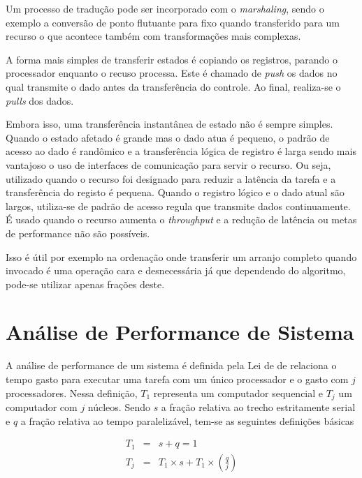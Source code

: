    Um processo de tradução pode ser incorporado com o \textit{marshaling}, sendo o exemplo a conversão de ponto flutuante para fixo quando transferido para um recurso o que acontece também com transformações mais complexas.
   
   A forma mais simples de transferir estados é copiando os registros, parando o processador enquanto o recuso processa.
   Este é chamado de \textit{push} os dados no qual transmite o dado antes da transferência do controle. Ao final, realiza-se o \textit{pulls} dos dados.
   
   
   Embora isso, uma transferência instantânea de estado não é sempre simples. Quando o estado afetado é grande mas o dado atua é pequeno, o padrão de acesso ao dado é randômico e a transferência lógica de registro é larga sendo mais vantajoso o uso de interfaces de comunicação para servir o recurso. Ou seja, utilizado quando o recurso foi designado para reduzir a latência da tarefa e a transferência do registo é pequena.
   Quando o registro lógico e o dado atual são largos, utiliza-se de padrão de acesso regula que transmite dados continuamente. É usado quando o recurso aumenta o \textit{throughput} e a redução de latência ou metas de performance não são possíveis.
   
   Isso é útil por exemplo na ordenação onde transferir um arranjo completo quando invocado é uma operação cara e desnecessária já que dependendo do algoritmo, pode-se utilizar apenas frações deste.



\section{Análise de Performance de Sistema} \label{sec:amdahl}
	A análise de performance de um sistema é definida pela Lei de \citeauthor{amdahl1967validity} de \citeyear{amdahl1967validity} relaciona o tempo gasto para executar uma tarefa com um único processador e o gasto com $j$ processadores. Nessa definição, $T_1$ representa um computador sequencial e $T_j$ um computador com $j$ núcleos. Sendo $s$ a fração relativa ao trecho estritamente serial e $q$ a fração relativa ao tempo paralelizável, tem-se as seguintes definições básicas

	\begin{eqnarray}
		T_1   & = & s + q = 1\\
		T_j & = & T_1 \times s + T_1 \times  \left(\frac{q}{j}\right)
	\end{eqnarray}


